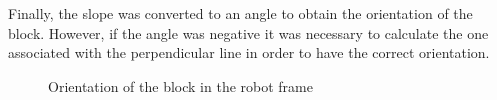 Finally, the slope was converted to an angle to obtain the orientation of the block. However, if the angle was negative it was necessary to calculate the one associated with the perpendicular line in order to have the correct orientation.

\begin{figure}[H]
\hfill
{}
\hfill
{}
\hfill
\caption{Orientation of the block in the robot frame}
\label{fig:image2}
\end{figure}